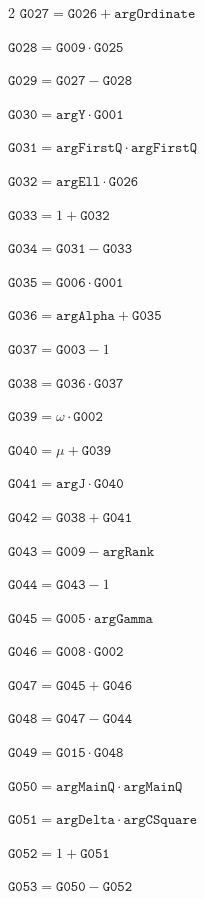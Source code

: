 \documentclass[10pt]{article}
\begin{document}
\begin{multicols}{2}
\noindent $\mathtt{G027}=\mathtt{G026}+\mathtt{argOrdinate}$\par
\noindent $\mathtt{G028}=\mathtt{G009}\cdot \mathtt{G025}$\par
\noindent $\mathtt{G029}=\mathtt{G027}-\mathtt{G028}$\par
\noindent $\mathtt{G030}=\mathtt{argY}\cdot \mathtt{G001}$\par
\noindent $\mathtt{G031}=\mathtt{argFirstQ}\cdot \mathtt{argFirstQ}$\par
\noindent $\mathtt{G032}=\mathtt{argEll}\cdot \mathtt{G026}$\par
\noindent $\mathtt{G033}=1+\mathtt{G032}$\par
\noindent $\mathtt{G034}=\mathtt{G031}-\mathtt{G033}$\par
\noindent $\mathtt{G035}=\mathtt{G006}\cdot \mathtt{G001}$\par
\noindent $\mathtt{G036}=\mathtt{argAlpha}+\mathtt{G035}$\par
\noindent $\mathtt{G037}=\mathtt{G003}-1$\par
\noindent $\mathtt{G038}=\mathtt{G036}\cdot \mathtt{G037}$\par
\noindent $\mathtt{G039}=\omega\cdot \mathtt{G002}$\par
\noindent $\mathtt{G040}=\mu+\mathtt{G039}$\par
\noindent $\mathtt{G041}=\mathtt{argJ}\cdot \mathtt{G040}$\par
\noindent $\mathtt{G042}=\mathtt{G038}+\mathtt{G041}$\par
\noindent $\mathtt{G043}=\mathtt{G009}-\mathtt{argRank}$\par
\noindent $\mathtt{G044}=\mathtt{G043}-1$\par
\noindent $\mathtt{G045}=\mathtt{G005}\cdot \mathtt{argGamma}$\par
\noindent $\mathtt{G046}=\mathtt{G008}\cdot \mathtt{G002}$\par
\noindent $\mathtt{G047}=\mathtt{G045}+\mathtt{G046}$\par
\noindent $\mathtt{G048}=\mathtt{G047}-\mathtt{G044}$\par
\noindent $\mathtt{G049}=\mathtt{G015}\cdot \mathtt{G048}$\par
\noindent $\mathtt{G050}=\mathtt{argMainQ}\cdot \mathtt{argMainQ}$\par
\noindent $\mathtt{G051}=\mathtt{argDelta}\cdot \mathtt{argCSquare}$\par
\noindent $\mathtt{G052}=1+\mathtt{G051}$\par
\noindent $\mathtt{G053}=\mathtt{G050}-\mathtt{G052}$\par

\end{multicols}
\end{document}
